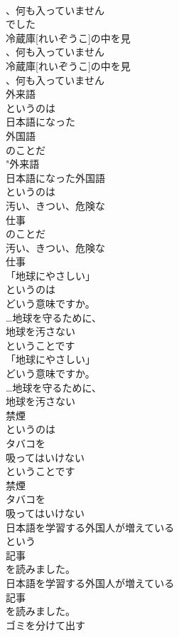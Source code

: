\documentclass[8pt]{extreport}
\begin{document}
\begin{CJK}{UTF8}{min}
\\	、何も入っていません
\\	でした
\\	冷蔵庫[れいぞうこ]の中を見
\\	、何も入っていません
\\	冷蔵庫[れいぞうこ]の中を見
\\	、何も入っていません
\\	外来語
\\	というのは
\\	日本語になった
\\	外国語
\\	のことだ
\\	"外来語
\\	日本語になった外国語
\\	というのは
\\	汚い、きつい、危険な
\\	仕事
\\	のことだ
\\	汚い、きつい、危険な
\\	仕事
\\	「地球にやさしい」
\\	というのは
\\	どいう意味ですか。
\\	…地球を守るために、
\\	地球を汚さない
\\	ということです
\\	「地球にやさしい」
\\	どいう意味ですか。
\\	…地球を守るために、
\\	地球を汚さない
\\	禁煙
\\	というのは
\\	タバコを
\\	吸ってはいけない
\\	ということです
\\	禁煙
\\	タバコを
\\	吸ってはいけない
\\	日本語を学習する外国人が増えている
\\	という
\\	記事
\\	を読みました。
\\	日本語を学習する外国人が増えている
\\	記事
\\	を読みました。
\\	ゴミを分けて出す

\end{CJK}
\end{document}
